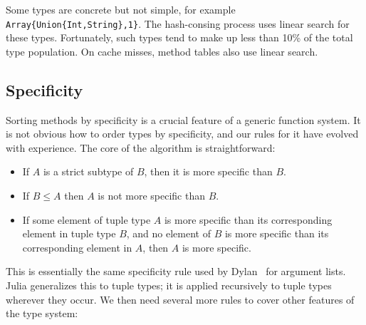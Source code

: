 Some types are concrete but not simple, for example
\texttt{Array\{Union\{Int,String\},1\}}.
The hash-consing process uses linear search for these types.
Fortunately, such types tend to make up less than 10\% of the total
type population.
On cache misses, method tables also use linear search.


\subsection{Specificity}

Sorting methods by specificity is a crucial feature of a generic
function system.
It is not obvious how to order types by specificity, and our
rules for it have evolved with experience.
The core of the algorithm is straightforward:

\begin{itemize}
\item If $A$ is a strict subtype of $B$, then it is more specific than $B$.
\item If $B\leq A$ then $A$ is not more specific than $B$.
\item If some element of tuple type $A$ is more specific than its corresponding
element in tuple type $B$, and no element of $B$ is more specific than its
corresponding element in $A$, then $A$ is more specific.
\end{itemize}


This is essentially the same specificity rule used by Dylan~\cite{dylanlang}
for argument lists.
Julia generalizes this to tuple types; it is applied recursively to tuple
types wherever they occur.
We then need several more rules to cover other features of the type system:

